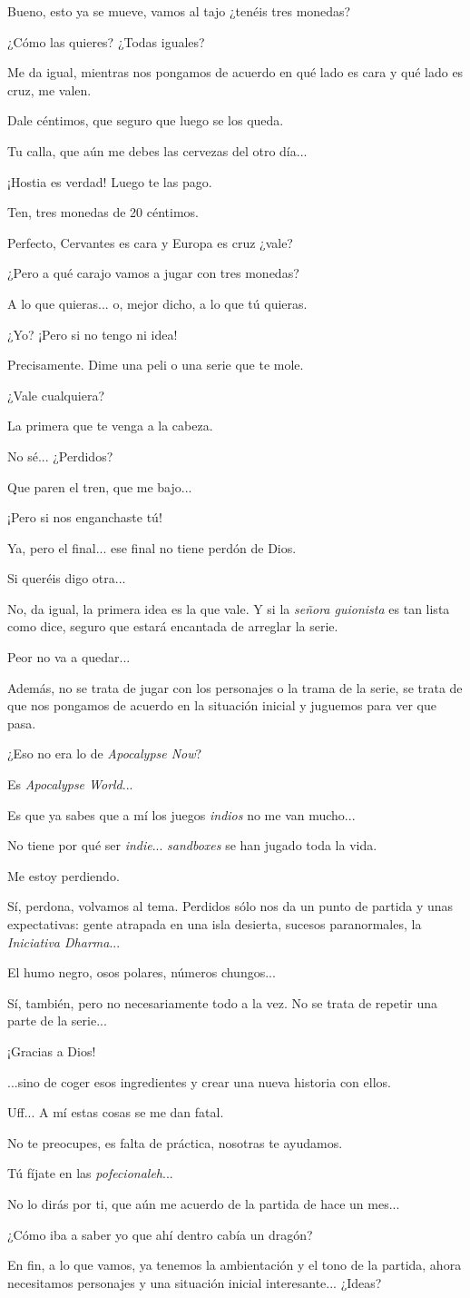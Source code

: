 \documentclass[10pt, a5paper, twocolumn]{article}
\newenvironment{dialogue}
    {\begin{description}[leftmargin=!,align=right,labelwidth=0.cm]}
    {\end{description}}
\newcommand\A{\item[\raisebox{-0.25em}{\scalebox{0.75}{\bctetraedre}}]}
\newcommand\B{\item[\raisebox{-0.25em}{\scalebox{0.75}{\bccube}}]}
\newcommand\E{\item[\raisebox{-0.25em}{\scalebox{0.75}{\bcicosaedre}}]}
\begin{document}
    \begin{dialogue}
        \E Bueno, esto ya se mueve, vamos al tajo ¿tenéis tres monedas?
        \A ¿Cómo las quieres? ¿Todas iguales?
        \E Me da igual, mientras nos pongamos de acuerdo en qué lado es cara y qué lado es cruz, me valen.
        \B Dale céntimos, que seguro que luego se los queda.
        \E Tu calla, que aún me debes las cervezas del otro día...
        \B ¡Hostia es verdad! Luego te las pago.
        \A Ten, tres monedas de 20 céntimos.
        \E Perfecto, Cervantes es cara y Europa es cruz ¿vale?
        \B ¿Pero a qué carajo vamos a jugar con tres monedas? 
        \E A lo que quieras... o, mejor dicho, a lo que tú quieras.
        \A ¿Yo? ¡Pero si no tengo ni idea!
        \E Precisamente. Dime una peli o una serie que te mole.
        \A ¿Vale cualquiera?
        \E La primera que te venga a la cabeza.
        \A No sé... ¿Perdidos?
        \B Que paren el tren, que me bajo...
        \E ¡Pero si nos enganchaste tú!
        \B Ya, pero el final... ese final no tiene perdón de Dios.
        \A Si queréis digo otra...
        \E No, da igual, la primera idea es la que vale. Y si la \emph{señora guionista} es tan lista como dice, seguro que estará encantada de arreglar la serie.
        \B Peor no va a quedar...
        \E Además, no se trata de jugar con los personajes o la trama de la serie, se trata de que nos pongamos de acuerdo en la situación inicial y juguemos para ver que pasa.
        \B ¿Eso no era lo de \emph{Apocalypse Now}?
        \E Es \emph{Apocalypse World}...
        \B Es que ya sabes que a mí los juegos \emph{indios} no me van mucho...
        \E No tiene por qué ser \emph{indie}... \emph{sandboxes} se han jugado toda la vida.
        \A Me estoy perdiendo.
        \E Sí, perdona, volvamos al tema. Perdidos sólo nos da un punto de partida y unas expectativas: gente atrapada en una isla desierta, sucesos paranormales, la \emph{Iniciativa Dharma}...
        \A El humo negro, osos polares, números chungos...
        \E Sí, también, pero no necesariamente todo a la vez. No se trata de repetir una parte de la serie...
        \B ¡Gracias a Dios!
        \E ...sino de coger esos ingredientes y crear una nueva historia con ellos.
        \A Uff... A mí estas cosas se me dan fatal.
        \E No te preocupes, es falta de práctica, nosotras te ayudamos.
        \B Tú fíjate en las \emph{pofecionaleh}...
        \E No lo dirás por ti, que aún me acuerdo de la partida de hace un mes...
        \B ¿Cómo iba a saber yo que ahí dentro cabía un dragón?
        \E En fin, a lo que vamos, ya tenemos la ambientación y el tono de la partida, ahora necesitamos personajes y una situación inicial interesante... ¿Ideas?

\end{dialogue}
\end{document}
